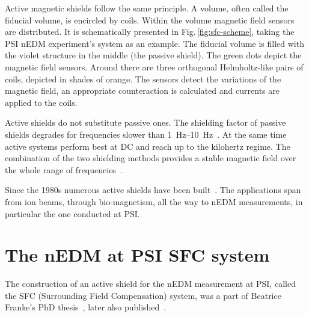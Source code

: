 Active magnetic shields follow the same principle. A volume, often called the fiducial volume, is encircled by coils. Within the volume magnetic field sensors are distributed. It is schematically presented in Fig.\,\ref{fig:sfc-scheme}, taking the PSI nEDM experiment's system as an example. The fiducial volume is filled with the violet structure in the middle (the passive shield). The green dots depict the magnetic field sensors. Around there are three orthogonal Helmholtz-like pairs of coils, depicted in shades of orange. The sensors detect the variations of the magnetic field, an appropriate counteraction is calculated and currents are applied to the coils.

Active shields do not substitute passive ones.
The shielding factor of passive shields degrades for frequencies slower than \SIrange[range-phrase = --]{1}{10}{\hertz}~\cite{Brake1991,PTBroom}.
At the same time active systems perform best at DC and reach up to the kilohertz regime.
The combination of the two shielding methods provides a stable magnetic field over the whole range of frequencies~\cite{Brake1991,Kelha1982,PTBroom,Voigt2013}.

Since the 1980s numerous active shields have been built~\cite{Kelha1982,Brake1991,Spemann2003,Brys2005,Kobayashi2012,Voigt2013,Afach2014}. The applications span from ion beams, through bio-magnetism, all the way to nEDM measurements, in particular the one conducted at PSI\@.

\section{The nEDM at PSI SFC system}
The construction of an active shield for the nEDM measurement at PSI, called the SFC (Surrounding Field Compensation) system,
was a part of Beatrice Franke's PhD thesis~\cite{Franke2013}, later also published~\cite{Afach2014}.


